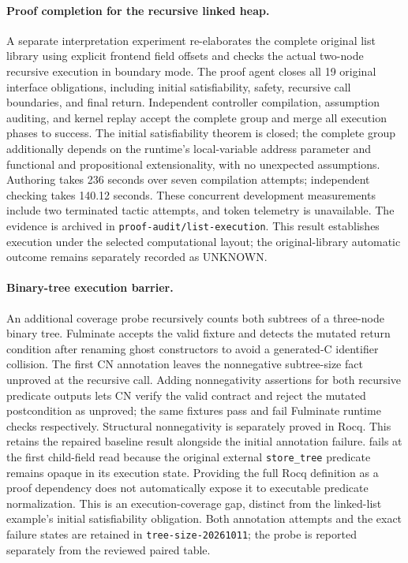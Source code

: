 \paragraph{Proof completion for the recursive linked heap.}
A separate interpretation experiment re-elaborates the complete original list
library using explicit frontend field offsets and checks the actual two-node
recursive execution in boundary mode. The proof agent closes all 19 original
interface obligations, including initial satisfiability, safety, recursive
call boundaries, and final return. Independent controller compilation,
assumption auditing, and kernel replay accept the complete group and merge
all execution phases to success. The initial satisfiability theorem is closed;
the complete group additionally depends on the runtime's local-variable
address parameter and functional and propositional extensionality, with no
unexpected assumptions. Authoring takes 236 seconds over seven compilation
attempts; independent checking takes 140.12 seconds. These concurrent
development measurements include two terminated tactic attempts, and token
telemetry is unavailable. The evidence is archived in
\texttt{proof-audit/list-execution}. This result establishes execution under
the selected computational layout; the original-library automatic outcome
remains separately recorded as UNKNOWN.

\paragraph{Binary-tree execution barrier.}
An additional coverage probe recursively counts both subtrees of a three-node
binary tree. Fulminate accepts the valid fixture and detects the mutated return
condition after renaming ghost constructors to avoid a generated-C identifier
collision. The first CN annotation leaves the nonnegative subtree-size fact unproved
at the recursive call. Adding nonnegativity assertions for both recursive
predicate outputs lets CN verify the valid contract and reject the mutated
postcondition as unproved; the same fixtures pass and fail Fulminate runtime
checks respectively. Structural nonnegativity is separately proved in Rocq.
This retains the repaired baseline result alongside the initial annotation failure. \tespec{} fails at the first child-field read because the
original external \texttt{store\_tree} predicate remains opaque in its
execution state. Providing the full Rocq definition as a proof dependency
does not automatically expose it to executable predicate normalization.
This is an execution-coverage gap, distinct from the linked-list example's
initial satisfiability obligation. Both annotation attempts and the exact
failure states are retained in \texttt{tree-size-20261011}; the probe is
reported separately from the reviewed paired table.

